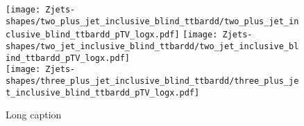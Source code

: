 \begin{figure}[!htb]
  \centering
  \texttt{[image: Zjets-shapes/two\_plus\_jet\_inclusive\_blind\_ttbardd/two\_plus\_jet\_inclusive\_blind\_ttbardd\_pTV\_logx.pdf]}
  \texttt{[image: Zjets-shapes/two\_jet\_inclusive\_blind\_ttbardd/two\_jet\_inclusive\_blind\_ttbardd\_pTV\_logx.pdf]} \\
  \texttt{[image: Zjets-shapes/three\_plus\_jet\_inclusive\_blind\_ttbardd/three\_plus\_jet\_inclusive\_blind\_ttbardd\_pTV\_logx.pdf]}
  \caption[Subtracted data versus the nominal $Z+$jets prediction,
  $p_{\mathrm{T}}^V$.]{Long caption}
  \label{fig:zjets-ptv-shapes}
\end{figure}